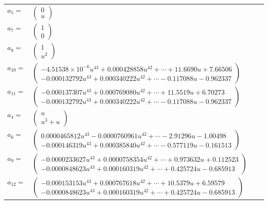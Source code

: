 \documentclass[1p]{elsarticle_modified}
\theoremstyle{definition}
\begin{document}
\begin{tabular}{m{7pt} m{180pt} m{7pt} m{180pt} }
\flushright $a_{5}=$&$\begin{pmatrix}0\\u\end{pmatrix}$ \\
\flushright $a_{7}=$&$\begin{pmatrix}1\\0\end{pmatrix}$ \\
\flushright $a_{8}=$&$\begin{pmatrix}1\\u^2\end{pmatrix}$ \\
\flushright $a_{10}=$&$\begin{pmatrix}-4.51538\times10^{-6} u^{43}+0.000428858 u^{42}+\cdots+11.6690 u+7.66506\\-0.000132792 u^{43}+0.000340222 u^{42}+\cdots-0.117088 u-0.962337\end{pmatrix}$ \\
\flushright $a_{11}=$&$\begin{pmatrix}-0.000137307 u^{43}+0.000769080 u^{42}+\cdots+11.5519 u+6.70273\\-0.000132792 u^{43}+0.000340222 u^{42}+\cdots-0.117088 u-0.962337\end{pmatrix}$ \\
\flushright $a_{4}=$&$\begin{pmatrix}u\\u^3+u\end{pmatrix}$ \\
\flushright $a_{6}=$&$\begin{pmatrix}0.0000465812 u^{43}-0.0000760961 u^{42}+\cdots-2.91296 u-1.00498\\-0.000146319 u^{43}+0.000385840 u^{42}+\cdots-0.577119 u-0.161513\end{pmatrix}$ \\
\flushright $a_{9}=$&$\begin{pmatrix}-0.0000233627 u^{43}+0.0000758354 u^{42}+\cdots+0.973632 u+0.112523\\-0.0000848623 u^{43}+0.000160319 u^{42}+\cdots+0.425724 u-0.685913\end{pmatrix}$ \\
\flushright $a_{12}=$&$\begin{pmatrix}-0.000153153 u^{43}+0.000767618 u^{42}+\cdots+10.5379 u+6.59579\\-0.0000848623 u^{43}+0.000160319 u^{42}+\cdots+0.425724 u-0.685913\end{pmatrix}$ \\

\end{tabular}
\end{document}
